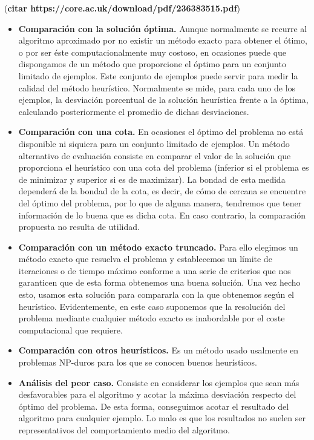 \documentclass[a4paper, 12pt, oneside]{book}
\begin{document}
	(\textbf{citar https://core.ac.uk/download/pdf/236383515.pdf})
	
	\begin{itemize}
		\item \textbf{Comparaci\'on con la soluci\'on \'optima.} Aunque normalmente se recurre al algoritmo aproximado por no existir un m\'etodo exacto para obtener el \'otimo, o por ser \'este computacionalmente muy costoso, en ocasiones puede que dispongamos de un m\'etodo que proporcione el \'optimo para un conjunto limitado de ejemplos. Este conjunto de ejemplos puede servir para medir la calidad del m\'etodo heur\'istico. Normalmente se mide, para cada uno de los ejemplos, la desviaci\'on porcentual de la soluci\'on heur\'istica frente a la \'optima, calculando posteriormente el promedio de dichas desviaciones.
		\item \textbf{Comparaci\'on con una cota.}  En ocasiones el \'optimo del problema no est\'a disponible ni siquiera para un conjunto limitado de ejemplos. Un m\'etodo alternativo de evaluaci\'on consiste en comparar el valor de la soluci\'on que proporciona el heur\'istico con una cota del problema (inferior si el problema es de minimizar y superior si es de maximizar). La bondad de esta medida depender\'a de la bondad de la cota, es decir, de c\'omo de cercana se encuentre del \'optimo del problema, por lo que de alguna manera, tendremos que tener informaci\'on de lo buena que es dicha cota. En caso contrario, la comparaci\'on propuesta no resulta de utilidad.
		\item \textbf{Comparaci\'on con un m\'etodo exacto truncado.} Para ello elegimos un m\'etodo exacto que resuelva el problema y establecemos un l\'imite de iteraciones o de tiempo m\'aximo conforme a una serie de criterios que nos garanticen que de esta forma obtenemos una buena soluci\'on. Una vez hecho esto, usamos esta soluci\'on para compararla con la que obtenemos seg\'un el heur\'istico. Evidentemente, en este caso suponemos que la resoluci\'on del problema mediante cualquier m\'etodo exacto es inabordable por el coste computacional que requiere.
		\item \textbf{Comparaci\'on con otros heur\'isticos.} Es un m\'etodo usado usalmente en problemas NP-duros para los que se conocen buenos heur\'isticos.
		\item \textbf{An\'alisis del peor caso.} Consiste en considerar los ejemplos que sean m\'as desfavorables para el algoritmo y acotar la m\'axima desviaci\'on respecto del \'optimo del problema. De esta forma, conseguimos acotar el resultado del algoritmo para cualquier ejemplo. Lo malo es que los resultados no suelen ser representativos del comportamiento medio del algoritmo.
	\end{itemize}
	
\end{document}
